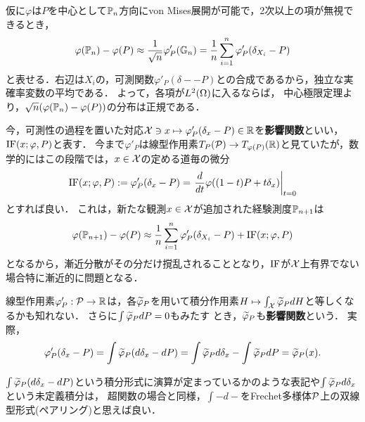 \documentclass[uplatex,dvipdfmx]{jsreport}
\begin{document}
\begin{discussion}
    仮に$\varphi$は$P$を中心として$\bP_n$方向にvon Mises展開が可能で，2次以上の項が無視できるとき，
    \[\varphi(\bP_n)-\varphi(P)\approx\frac{1}{\sqrt{n}}\varphi'_P(\bG_n)=\frac{1}{n}\sum^n_{i=1}\varphi'_P(\delta_{X_i}-P)\]
    と表せる．右辺は$X_i$の，可測関数$\varphi'_P(\delta--P)$との合成であるから，独立な実確率変数の平均である．
    よって，各項が$L^2(\Om)$に入るならば，
    中心極限定理より，$\sqrt{n}(\varphi(\bP_n)-\varphi(P))$の分布は正規である．

    今，可測性の過程を置いた対応$\X\ni x\mapsto\varphi'_P(\delta_x-P)\in\R$を\textbf{影響関数}といい，$\IF(x;\varphi,P)$と表す．
    今まで$\varphi'_P$は線型作用素$T_P(\P)\to T_{\varphi(P)}(\R)$と見ていたが，数学的にはこの段階では，$x\in\X$の定める道毎の微分
    \[\IF(x;\varphi,P):=\varphi'_P(\delta_x-P)=\left.\dd{}{t}\varphi((1-t)P+t\delta_x)\right|_{t=0}\]
    とすれば良い．
    これは，新たな観測$x\in\X$が追加された経験測度$\bP_{n+1}$は
    \[\varphi(\bP_{n+1})-\varphi(P)\approx\frac{1}{n}\sum^n_{i=1}\varphi'_P(\delta_{X_i}-P)+\IF(x;\varphi,P)\]
    となるから，漸近分散がその分だけ撹乱されることとなり，$\IF$が$\X$上有界でない場合特に漸近的に問題となる．
\end{discussion}
\begin{discussion}[影響関数の具体的表示ができるとき]
    線型作用素$\varphi'_P:\P\to\R$は，各$\wt{\varphi}_P$を用いて積分作用素$H\mapsto\int_\X\wt{\varphi}_PdH$と等しくなるかも知れない．
    さらに$\int\wt{\varphi}_PdP=0$もみたす
    とき，$\wt{\varphi}_P$も\textbf{影響関数}という．
    実際，
    \[\varphi'_P(\delta_x-P)=\int\wt{\varphi}_P(d\delta_x-dP)=\int\wt{\varphi}_Pd\delta_x-\int\wt{\varphi}_PdP=\wt{\varphi}_P(x).\]
\end{discussion}
\begin{remark}[記法の基礎づけについて]
    $\int\wt{\varphi}_P(d\delta_x-dP)$という積分形式に演算が定まっているかのような表記や$\int\wt{\varphi}_Pd\delta_x$という未定義積分は，
    超関数の場合と同様，$\int-d-$をFrechet多様体$\P$上の双線型形式(ペアリング)と思えば良い．
\end{remark}
\end{document}
